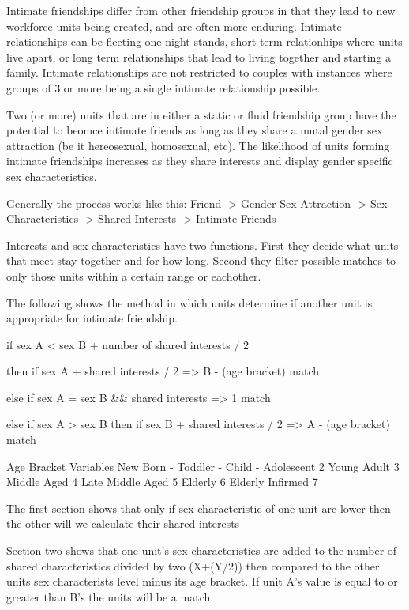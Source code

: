 
Intimate friendships differ from other friendship groups in that they lead to new workforce units being created, and are often more enduring. Intimate relationships can be fleeting one night stands, short term relationhips where units live apart, or long term relationships that lead to living together and starting a family. Intimate relationships are not restricted to couples with instances where groups of 3 or more being a single intimate relationship possible.   

Two (or more) units that are in either a static or fluid friendship group have the potential to beomce intimate friends as long as they share a mutal gender sex attraction (be it hereosexual, homosexual, etc). The likelihood of units forming intimate friendships increases as they share interests and display gender specific sex characteristics. 

Generally the process works like this: Friend -> Gender Sex Attraction -> Sex Characteristics -> Shared Interests -> Intimate Friends

Interests and sex characteristics have two functions. First they decide what units that meet stay together and for how long. Second they filter possible matches to only those units within a certain range or eachother.

The following shows the method in which units determine if another unit is appropriate for intimate friendship.

if sex A < sex B 
+ number of shared interests / 2 
 
 then
  if sex A + shared interests / 2 => B - (age bracket)
  match

else if sex A = sex B && shared interests => 1
  match

else if sex A > sex B
 then
  if sex B + shared interests / 2 => A - (age bracket)
  match


Age Bracket Variables
New Born		-
Toddler			-
Child			-
Adolescent		2
Young Adult		3
Middle Aged		4
Late Middle Aged	5	
Elderly			6
Elderly Infirmed	7
	
The first section shows that only if sex characteristic of one unit are lower then the other will we calculate their shared interests

Section two shows that one unit's sex characteristics are added to the number of shared characteristics divided by two (X+(Y/2)) then compared to the other units sex characterists level minus its age bracket. If unit A's value is equal to or greater than B's the units will be a match. 

